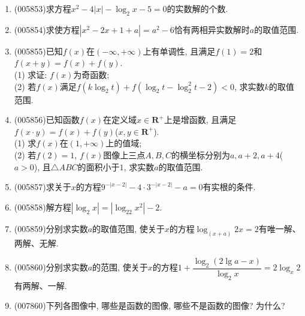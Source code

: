 \documentclass[10pt,a4paper]{article}
\begin{document}
\begin{enumerate}[1.]
\item {\tiny (005853)}求方程$x^2-4|x|-\log_2x-5=0$的实数解的个数.
\item {\tiny (005854)}求使方程$|x^2-2x+1+a|=a^2-6$恰有两相异实数解时$a$的取值范围.
\item {\tiny (005855)}已知$f(x)$在$(-\infty ,+\infty)$上有单调性, 且满足$f(1)=2$和$f(x+y)=f(x)+f(y)$.\\
(1) 求证: $f(x)$为奇函数;\\
(2) 若$f(x)$满足$f(k\log_2t)+f(\log_2t-\log_2^2t-2)<0$, 求实数$k$的取值范围.
\item {\tiny (005856)}已知函数$f(x)$在定义域$x\in \mathbf{R}^+$上是增函数, 且满足$f(x\cdot y)=f(x)+f(y)$($x,y\in \mathbf{R}^+$).\\
(1) 求$f(x)$在$(1,+\infty)$上的值域;\\
(2) 若$f(2)=1$, $f(x)$图像上三点$A,B,C$的横坐标分别为$a,a+2,a+4$($a>0$), 且$\triangle ABC$的面积小于$1$, 求实数$a$的取值范围.
\item {\tiny (005857)}求关于$x$的方程$9^{-|x-2|}-4\cdot 3^{-|x-2|}-a=0$有实根的条件.
\item {\tiny (005858)}解方程$|\log_2x|=|\log_22x^2|-2$.
\item {\tiny (005859)}分别求实数$a$的取值范围, 使关于$x$的方程$\log_{(x+a)}2x=2$有唯一解、两解、无解.
\item {\tiny (005860)}分别求实数$a$的范围, 使关于$x$的方程$1+\dfrac{\log_2(2\lg a-x)}{\log_2x}=2\log_x2$有两解、一解.
\item {\tiny (007860)}下列各图像中, 哪些是函数的图像, 哪些不是函数的图像? 为什么?
\begin{center}
\end{center}
\end{enumerate}
\end{document}
